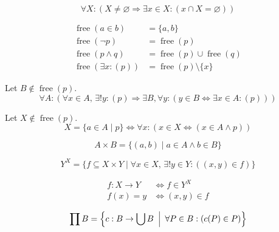 \documentclass{main}
\begin{document}
\begin{axiom}[Foundation]
$$
	\forall X:(
		X\neq\varnothing
		\Rightarrow
		\exists x\in X:(
			x\cap X
			=
			\varnothing
		)
	)
$$
\end{axiom}

\begin{definition}
\begin{align*}
	\operatorname{free}(a\in b)
	&=
	\{a,b\}
	\\
	\operatorname{free}(\neg p)
	&=
	\operatorname{free}(p)
	\\
	\operatorname{free}(p\land q)
	&=
	\operatorname{free}(p)
	\cup
	\operatorname{free}(q)
	\\
	\operatorname{free}(
		\exists x:(p)
	)
	&=
	\operatorname{free}(p)
	\setminus
	\{x\}
\end{align*}
\end{definition}

\begin{axiom}[Replacement]
Let $B\notin\operatorname{free}(p)$.
$$
	\forall A:(
		\forall x\in A,\,
		\exists!y:(
			p
		)
		\Rightarrow
		\exists B,
		\forall y:(
			y\in B
			\Leftrightarrow
			\exists x\in A:(p)
		)
	)
$$
\end{axiom}

\begin{definition}
Let $X\notin\operatorname{free}(p)$.
$$
	X=\{a\in A\mid p\}
	\Leftrightarrow
	\forall x:(
		x\in X
		\Leftrightarrow
		(
			x\in A
			\land
			p
		)
	)
$$
\end{definition}

\begin{definition}
$$
	A\times B
	=
	\{
		(a,b)
		\mid
		a\in A
		\land
		b\in B
	\}
$$
\end{definition}

\begin{definition}
$$
	Y^{X}
	=
	\{
		f\subseteq X\times Y
		\mid
		\forall x\in X,\,
		\exists!y\in Y:(
			(x,y)\in f
		)
	\}
$$
\end{definition}

\begin{definition}[Function]
\begin{align*}
	f:X\to Y
	&\Leftrightarrow
	f\in Y^{X}
	\\
	f(x)=y
	&\Leftrightarrow
	(x,y)\in f
\end{align*}
\end{definition}

\begin{definition}
$$
	\prod B
	=
	\mleft\{
		c:B\to\bigcup B
		\setmiddle
		\forall P\in B:(
			c(P)\in P
		)
	\mright\}
$$
\end{definition}
\end{document}
